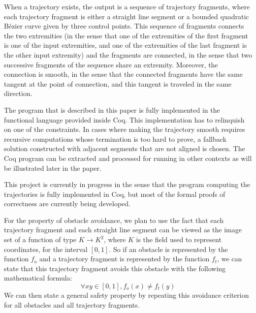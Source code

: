 \documentclass{llncs}
\begin{document}
When a trajectory exists, the output is a sequence of trajectory
fragments, where each trajectory
fragment is either a straight line segment or a bounded quadratic Bézier
curve given by three control points.  This sequence of fragments connects
the two extremities (in the sense that one of the extremities of the
first fragment is one of the input extremities, and one of the
extremities of the last fragment is the other input extremity) and the
fragments are connected, in the sense that two successive fragments of
the sequence share an extremity.  Moreover, the connection is smooth,
in the sense that the connected fragments have the same tangent at the
point of connection, and this tangent is traveled in the same direction.

The program that is described in this paper is fully implemented in
the functional language provided inside Coq.  This implementation has
to relinquish on one of the constraints.  In cases where making the
trajectory smooth requires recursive computations whose termination is
too hard to prove, a fallback solution constructed with
adjacent segments that are not aligned is chosen.  The Coq
program can be extracted and processed for running in other
contexts as will be illustrated later in the paper.

This project is currently in progress in the sense that the program
computing the trajectories is fully implemented in Coq, but most of the
formal proofs of correctness are currently being developed.

For the property of obstacle avoidance, we plan to use the fact that
each trajectory fragment and each straight line segment can be viewed
as the image set of a function of type \(K \rightarrow K^2\), where \(K\) is
the field used to
represent coordinates, for the interval \([0,1]\).  So if an obstacle is
represented by the function \(f_o\) and a trajectory fragment is
represented by the function \(f_t\), we can state that this trajectory
fragment avoids this obstacle with the following mathematical formula:
\[\forall x y \in [0,1], f_o(x) \neq f_t(y)\]
We can then state a general safety property by repeating this avoidance
criterion for all obstacles and all trajectory fragments.
\end{document}
